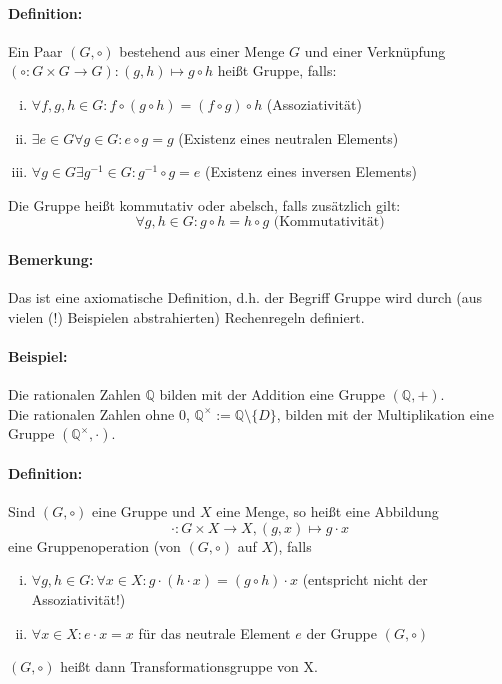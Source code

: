 \documentclass[12pt,a4paper,parskip=half-,DIV=15]{scrartcl}
\begin{document}
\paragraph{Definition:} Ein Paar $(G,\circ)$ bestehend aus einer Menge $G$ und einer Verknüpfung $(\circ : G\times G \to G) : (g,h) \mapsto g \circ h$ heißt Gruppe, falls:

\begin{enumerate}[(i)]
\item $\forall f,g,h\in G : f\circ (g\circ h) = (f\circ g)\circ h$ (Assoziativität)
\item $\exists e\in G\forall g\in G : e\circ g = g$ (Existenz eines neutralen Elements)
\item $\forall g \in G \exists g^{-1} \in G : g^{-1}\circ g = e$ (Existenz eines inversen Elements)
\end{enumerate}

Die Gruppe heißt kommutativ oder abelsch, falls zusätzlich gilt:
\begin{equation*}
\forall g,h\in G: g\circ h = h\circ g \text{ (Kommutativität)} 
\end{equation*}

\paragraph{Bemerkung:} Das ist eine axiomatische Definition, d.h. der Begriff \glqq Gruppe\grqq{} wird durch (aus vielen (!) Beispielen abstrahierten) \glqq Rechenregeln\grqq{} definiert.
\paragraph{Beispiel:} Die rationalen Zahlen $\mathbb{Q}$ bilden mit der Addition eine Gruppe $(\mathbb{Q} ,+)$.\\
Die rationalen Zahlen ohne $0$, $\mathbb{Q}^{\times} := \mathbb{Q}\setminus \{D\}$, bilden mit der Multiplikation eine Gruppe $(\mathbb{Q}^\times ,\cdot)$.

\paragraph{Definition:} Sind $(G,\circ )$ eine Gruppe und $X$ eine Menge, so heißt eine Abbildung 
\begin{equation*}\cdot : G\times X\to X, (g,x)\mapsto g\cdot x\end{equation*}
eine Gruppenoperation (von $(G,\circ )$ auf $X$), falls
\begin{enumerate}[(i)]
\item $\forall g,h\in G :\forall x\in X: g\cdot (h\cdot x) = (g\circ h)\cdot x$ (entspricht nicht der Assoziativität!)
\item $\forall x\in X: e\cdot x = x$ für das neutrale Element $e$ der Gruppe $(G,\circ )$
\end{enumerate}
$(G,\circ )$ heißt dann Transformationsgruppe von X.
\end{document}

